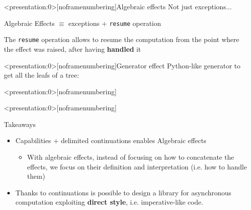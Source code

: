 \documentclass[aspectratio=1610,xcolor=dvipsnames,handout]{beamer}
\begin{document}
%
\begin{frame}<presentation:0>[noframenumbering]{Algebraic effects}
  Not just exceptions...
  \begin{block}{}
    Algebraic Effects $\equiv$ exceptions + \texttt{resume} operation \cite{can-throw}
  \end{block}
  The \texttt{resume} operation allows to resume the computation from the point where the effect was raised, after having \textbf{handled} it
  
\end{frame}
%
\begin{frame}<presentation:0>[noframenumbering]{Generator effect \cite{scalar-gears}}
  Python-like generator to get all the leafs of a tree:
  
\end{frame}
%
\begin{frame}<presentation:0>[noframenumbering]
     
\end{frame}
%
\begin{frame}<presentation:0>[noframenumbering]
  \begin{block}{Takeaways}
    \begin{itemize}
      \item Capabilities + delimited continuations enables Algebraic effects
      \begin{itemize}
        \item With algebraic effects, instead of focusing on how to concatenate the effects, we focus on their definition and interpretation (i.e. how to handle them)
      \end{itemize}
      \item Thanks to continuations is possible to design a library for asynchronous computation exploiting \textbf{direct style}, i.e. imperative-like code.
    \end{itemize}
  \end{block}
\end{frame}
\end{document}
